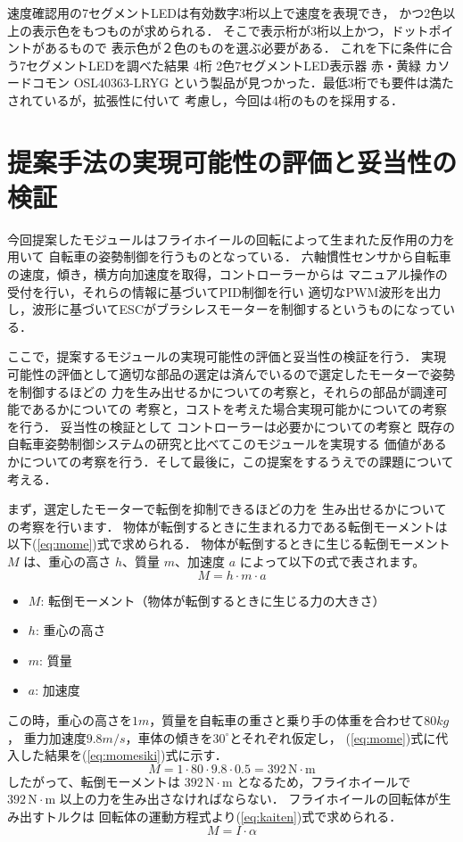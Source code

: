 \documentclass[uplatex,dvipdfmx]{jsarticle}
\begin{document}
速度確認用の7セグメントLEDは有効数字3桁以上で速度を表現でき，
かつ2色以上の表示色をもつものが求められる．
そこで表示桁が3桁以上かつ，ドットポイントがあるもので
表示色が２色のものを選ぶ必要がある．
これを下に条件に合う7セグメントLEDを調べた結果
4桁 2色7セグメントLED表示器 赤・黄緑 カソードコモン OSL40363-LRYG
という製品が見つかった\cite{seg7}．最低3桁でも要件は満たされているが，拡張性に付いて
考慮し，今回は4桁のものを採用する．


\section{提案手法の実現可能性の評価と妥当性の検証}
今回提案したモジュールはフライホイールの回転によって生まれた反作用の力を用いて
自転車の姿勢制御を行うものとなっている．
六軸慣性センサから自転車の速度，傾き，横方向加速度を取得，コントローラーからは
マニュアル操作の受付を行い，それらの情報に基づいてPID制御を行い
適切なPWM波形を出力し，波形に基づいてESCがブラシレスモーターを制御するというものになっている．

ここで，提案するモジュールの実現可能性の評価と妥当性の検証を行う．
実現可能性の評価として適切な部品の選定は済んでいるので選定したモーターで姿勢を制御するほどの
力を生み出せるかについての考察と，それらの部品が調達可能であるかについての
考察と，コストを考えた場合実現可能かについての考察を行う．
妥当性の検証として
コントローラーは必要かについての考察と
既存の自転車姿勢制御システムの研究と比べてこのモジュールを実現する
価値があるかについての考察を行う．そして最後に，この提案をするうえでの課題について考える．

まず，選定したモーターで転倒を抑制できるほどの力を
生み出せるかについての考察を行います．
物体が転倒するときに生まれる力である転倒モーメントは以下(\ref{eq:mome})式で求められる\cite{mome}．
物体が転倒するときに生じる転倒モーメント \( M \) は、重心の高さ \( h \)、質量 \( m \)、加速度 \( a \) によって以下の式で表されます。
\begin{equation}
M = h \cdot m \cdot a
\label{eq:mome}
\end{equation}
\begin{itemize}
    \item \( M \): 転倒モーメント（物体が転倒するときに生じる力の大きさ）
    \item \( h \): 重心の高さ
    \item \( m \): 質量
    \item \( a \): 加速度
\end{itemize}
この時，重心の高さを$1m$，質量を自転車の重さと乗り手の体重を合わせて$80kg$，
重力加速度$9.8m/s$，車体の傾きを$30^\circ$とそれぞれ仮定し，
(\ref{eq:mome})式に代入した結果を(\ref{eq:momesiki})式に示す．
\begin{equation}
M = 1 \cdot 80 \cdot 9.8 \cdot 0.5 = 392 \, \mathrm{N \cdot m}
\label{eq:momesiki}
\end{equation}
したがって、転倒モーメントは $ 392 \, \mathrm{N \cdot m} $ 
となるため，フライホイールで$ 392 \, \mathrm{N \cdot m} $ 以上の力を生み出さなければならない．
フライホイールの回転体が生み出すトルクは
回転体の運動方程式より(\ref{eq:kaiten})式で求められる\cite{kaite}．
\begin{equation}
M = I \cdot \alpha
\label{eq:kaiten}
\end{equation}
\end{document}
